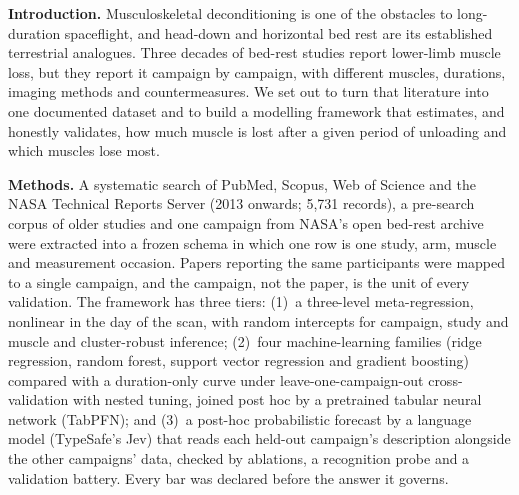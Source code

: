 \begin{small}
\noindent\textbf{\sffamily Introduction.} Musculoskeletal deconditioning is one of the obstacles to long-duration
spaceflight, and head-down and horizontal bed rest are its established terrestrial analogues. Three decades of
bed-rest studies report lower-limb muscle loss, but they report it campaign by campaign, with different muscles,
durations, imaging methods and countermeasures. We set out to turn that literature into one documented dataset
and to build a modelling framework that estimates, and honestly validates, how much muscle is lost after a given
period of unloading and which muscles lose most.

\noindent\textbf{\sffamily Methods.} A systematic search of PubMed, Scopus, Web of Science and the NASA Technical
Reports Server (2013 onwards; 5,731 records), a pre-search corpus of older studies and one campaign from NASA's
open bed-rest archive were extracted into a frozen schema in which one row is one study, arm, muscle and
measurement occasion. Papers reporting the same participants were mapped to a single campaign, and the campaign,
not the paper, is the unit of every validation. The framework has three tiers: (1)~a three-level meta-regression,
nonlinear in the day of the scan, with random intercepts for campaign, study and muscle and cluster-robust
inference; (2)~four machine-learning families (ridge regression, random forest, support vector regression and
gradient boosting) compared with a duration-only curve under leave-one-campaign-out cross-validation with nested
tuning, joined post hoc by a pretrained tabular neural network (TabPFN); and (3)~a post-hoc probabilistic forecast by a language model (TypeSafe's Jev) that reads each held-out
campaign's description alongside the other campaigns' data, checked by ablations, a recognition probe and a
validation battery. Every bar was declared before the answer it governs.


\end{small}
